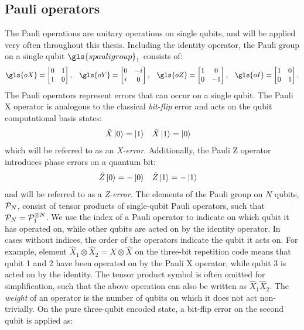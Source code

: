 \subsection{Pauli operators}\label{subsec:pauli}

The Pauli operations are unitary operations on single qubits, and will be applied very often throughout this thesis. Including the identity operator, the Pauli group on a single qubit $\gls{spauligroup}_1$ consists of:
\begin{align}
  \gls{oX} = \begin{bmatrix} 0 & 1 \\ 1 & 0 \end{bmatrix}, &&
  \gls{oY} = \begin{bmatrix} 0 & -i \\ i & 0 \end{bmatrix}, &&
  \gls{oZ} = \begin{bmatrix} 1 & 0 \\ 0 & -1 \end{bmatrix}, &&
  \gls{oI} = \begin{bmatrix} 1 & 0 \\ 0 & 1 \end{bmatrix}.
\end{align}
The Pauli operators represent errors that can occur on a single qubit. The Pauli X operator is analogous to the classical \emph{bit-flip} error and acts on the qubit computational basis states:
\begin{align}\label{eqq:qec_bitflip}
  & \hat{X}\ket{0} = \ket{1} && \hat{X}\ket{1} = \ket{0} &
\end{align}
which will be referred to as an \emph{X-error}. Additionally, the Pauli Z operator introduces phase errors on a quantum bit:
\begin{align}\label{eq:eqc_phaseflip}
  & \hat{Z}\ket{0} = -\ket{0} && \hat{Z}\ket{1} = -\ket{1} &
\end{align}
and will be referred to as a \emph{Z-error}. The elements of the Pauli group on $N$ qubits, $\mathcal{P}_N$, consist of tensor products of single-qubit Pauli operators, such that  $\mathcal{P}_N = \mathcal{P}_1^{\otimes N}$. We use the index of a Pauli operator to indicate on which qubit it has operated on, while other qubits are acted on by the identity operator. In cases without indices, the order of the operators indicate the qubit it acts on. For example, element $\hat{X}_1\otimes \hat{X}_2=\hat{X}\otimes \hat{X}$ on the three-bit repetition code means that qubit 1 and 2 have been operated on by the Pauli X operator, while qubit 3 is acted on by the identity. The tensor product symbol is often omitted for simplification, such that the above operation can also be written as $\hat{X}_1\hat{X}_2$. The \emph{weight} of an operator is the number of qubits on which it does not act non-trivially. On the pure  three-qubit encoded state, a bit-flip error on the second qubit is applied as:
